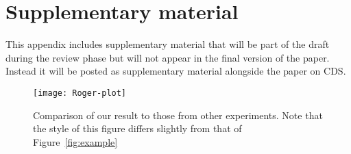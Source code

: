 \clearpage

\section{Supplementary material}
\label{sec:Supplementary-App}

This appendix includes supplementary material that will be 
  part of the draft during the review phase but will not appear in the
  final version of the paper. Instead it will be posted as supplementary
  material alongside the paper on CDS.

\begin{figure}[!htb]
  \begin{center}
    \texttt{[image: Roger-plot]}
    \vspace*{-1.0cm}
  \end{center}
  \caption{
    \small %
    Comparison of our result to those from other experiments.
    Note that the style of this figure differs slightly from that of Figure~\ref{fig:example}}
  \label{fig:roger}
\end{figure}

\clearpage
